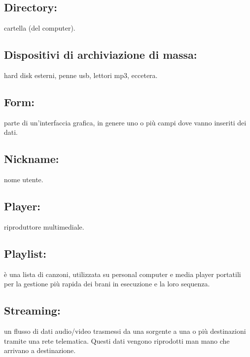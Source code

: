 \subsection*{Directory:} cartella (del computer).
\subsection*{Dispositivi di archiviazione di massa:} hard disk esterni, penne
usb, lettori mp3, eccetera.
\subsection*{Form:} parte di un'interfaccia grafica, in genere uno o pi\`u campi
dove vanno inseriti dei dati. 
\subsection*{Nickname:} nome utente.
\subsection*{Player:} riproduttore multimediale.
\subsection*{Playlist:} \`e una lista di canzoni, utilizzata su
personal computer e media player portatili per la gestione pi\`u rapida dei
brani in esecuzione e la loro sequenza.
\subsection*{Streaming:} un flusso di dati audio/video trasmessi da una sorgente
a una o pi\`u destinazioni tramite una rete telematica. Questi dati vengono
riprodotti man mano che arrivano a destinazione.

\listoffigures

